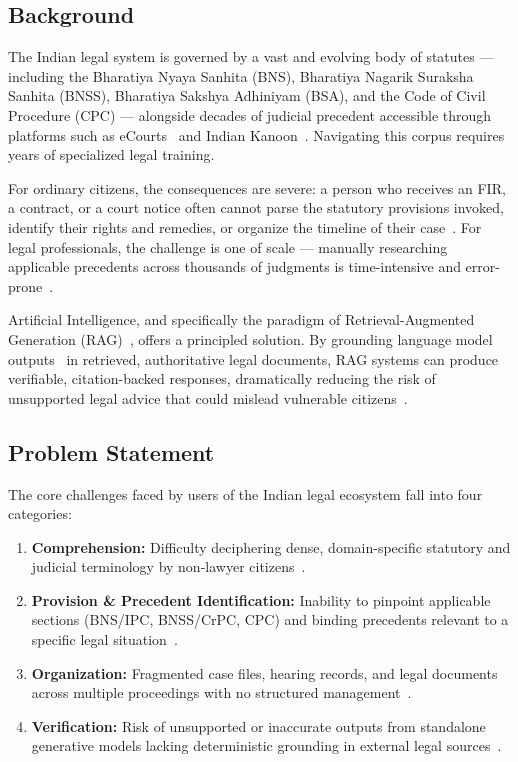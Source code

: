 \documentclass[12pt,a4paper]{article}
\begin{document}
\subsection{Background}

The Indian legal system is governed by a vast and evolving body of statutes ---
including the Bharatiya Nyaya Sanhita (BNS), Bharatiya Nagarik Suraksha Sanhita
(BNSS), Bharatiya Sakshya Adhiniyam (BSA), and the Code of Civil Procedure (CPC)
--- alongside decades of judicial precedent accessible through platforms such as
eCourts~\cite{ecourts} and Indian Kanoon~\cite{indiankanoon}. Navigating this
corpus requires years of specialized legal training.

For ordinary citizens, the consequences are severe: a person who receives an FIR, a
contract, or a court notice often cannot parse the statutory provisions invoked, identify
their rights and remedies, or organize the timeline of their case~\cite{const_india,mlaw}.
For legal professionals, the challenge is one of scale --- manually researching applicable
precedents across thousands of judgments is time-intensive and error-prone~\cite{ashley2017ai}.

Artificial Intelligence, and specifically the paradigm of Retrieval-Augmented
Generation (RAG)~\cite{lewis2020rag}, offers a principled solution. By grounding
language model outputs~\cite{vaswani2017attention, devlin2019bert} in retrieved,
authoritative legal documents, RAG systems can produce verifiable, citation-backed
responses, dramatically reducing the risk of unsupported legal advice that could
mislead vulnerable citizens~\cite{guha2023legalbench}.

\subsection{Problem Statement}

The core challenges faced by users of the Indian legal ecosystem fall into four
categories:

\begin{enumerate}[leftmargin=*, label=\arabic*.]
  \item \textbf{Comprehension:} Difficulty deciphering dense, domain-specific statutory
    and judicial terminology by non-lawyer citizens~\cite{const_india}.
  \item \textbf{Provision \& Precedent Identification:} Inability to pinpoint applicable
    sections (BNS/IPC, BNSS/CrPC, CPC) and binding precedents relevant to a specific
    legal situation~\cite{feng2022survey, cui2022survey}.
  \item \textbf{Organization:} Fragmented case files, hearing records, and legal
    documents across multiple proceedings with no structured management~\cite{ecourts}.
  \item \textbf{Verification:} Risk of unsupported or inaccurate outputs from standalone
    generative models lacking deterministic grounding in external legal
    sources~\cite{lewis2020rag, guha2023legalbench}.
\end{enumerate}
\end{document}
